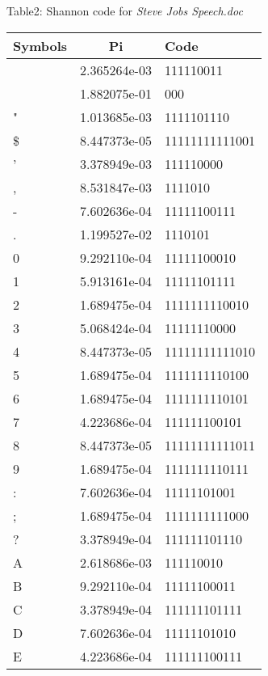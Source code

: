 \documentclass[12pt]{article} %
\numberwithin{equation}{section}
\begin{document}
\begin{center}
  Table2: Shannon code for \emph{Steve Jobs Speech.doc}
\end{center}

\setlength{\arrayrulewidth}{0.7mm}

\begin{table}[!hptb]
\begin{minipage}{.5\linewidth}
\centering
\begin{tabular}{lcl}  %
\hline
Symbols  &Pi 				 &Code \\     \hline
 		 &2.365264e-03 		 &111110011\\
  		 &1.882075e-01 		 &000\\
" 		 &1.013685e-03 		 &1111101110\\
\$ 		 &8.447373e-05 		 &11111111111001\\
' 		 &3.378949e-03 		 &111110000\\
, 		 &8.531847e-03 		 &1111010\\
- 		 &7.602636e-04 		 &11111100111\\
. 		 &1.199527e-02 		 &1110101\\
0 		 &9.292110e-04 		 &11111100010\\
1 		 &5.913161e-04 		 &11111101111\\
2 		 &1.689475e-04 		 &1111111110010\\
3 		 &5.068424e-04 		 &11111110000\\
4 		 &8.447373e-05 		 &11111111111010\\
5 		 &1.689475e-04 		 &1111111110100\\
6 		 &1.689475e-04 		 &1111111110101\\
7 		 &4.223686e-04 		 &111111100101\\
8 		 &8.447373e-05 		 &11111111111011\\
9 		 &1.689475e-04 		 &1111111110111\\
: 		 &7.602636e-04 		 &11111101001\\
; 		 &1.689475e-04 		 &1111111111000\\
? 		 &3.378949e-04 		 &111111101110\\
A 		 &2.618686e-03 		 &111110010\\
B 		 &9.292110e-04 		 &11111100011\\
C 		 &3.378949e-04 		 &111111101111\\
D 		 &7.602636e-04 		 &11111101010\\
E 		 &4.223686e-04 		 &111111100111\\

\end{tabular}
\end{minipage}
\end{table}
\end{document}

